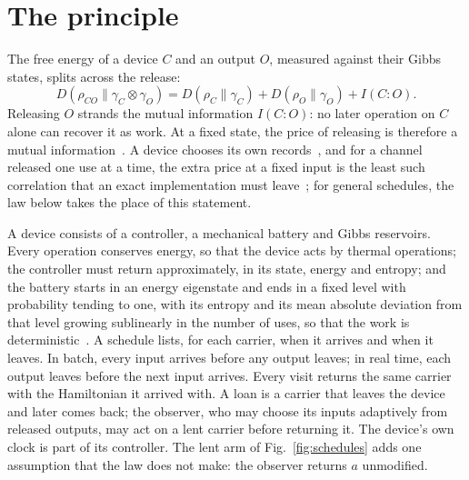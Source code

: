 \documentclass[11pt]{article}
\begin{document}
\section*{The principle}
The free energy of a device $C$ and an output $O$, measured against their Gibbs states, splits across the release:
\begin{equation}\label{eq:split}
D(\rho_{CO}\|\gamma_C\!\otimes\!\gamma_O)=D(\rho_C\|\gamma_C)+D(\rho_O\|\gamma_O)+I(C{:}O).
\end{equation}
Releasing $O$ strands the mutual information $I(C{:}O)$: no later operation on $C$ alone can recover it as work. At a fixed state, the price of releasing is therefore a mutual information~\cite{Order}. A device chooses its own records~\cite{Bennett73}, and for a channel released one use at a time, the extra price at a fixed input is the least such correlation that an exact implementation must leave~\cite[Thms.~1, 11]{SaveWork}; for general schedules, the law below takes the place of this statement.

A device consists of a controller, a mechanical battery and Gibbs reservoirs. Every operation conserves energy, so that the device acts by thermal operations; the controller must return approximately, in its state, energy and entropy; and the battery starts in an energy eigenstate and ends in a fixed level with probability tending to one, with its entropy and its mean absolute deviation from that level growing sublinearly in the number of uses, so that the work is deterministic~\cite{SaveWork,Order}. A schedule lists, for each carrier, when it arrives and when it leaves. In batch, every input arrives before any output leaves; in real time, each output leaves before the next input arrives. Every visit returns the same carrier with the Hamiltonian it arrived with. A loan is a carrier that leaves the device and later comes back; the observer, who may choose its inputs adaptively from released outputs, may act on a lent carrier before returning it. The device's own clock is part of its controller. The lent arm of Fig.~\ref{fig:schedules} adds one assumption that the law does not make: the observer returns $a$ unmodified.
\end{document}
